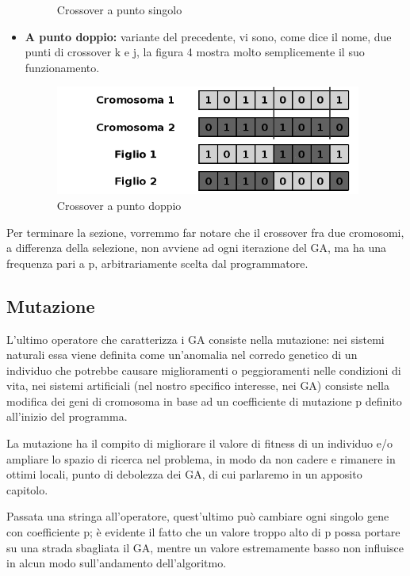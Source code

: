 \begin{itemize}
\begin{figure}[H]
        \caption{Crossover a punto singolo}
        \label{fig:singlepointcrossover}
    \end{figure}
    \item \textbf{A punto doppio:} variante del precedente, vi sono, come dice il nome, due punti di crossover k e j, la figura 4 mostra molto semplicemente il suo funzionamento.
    \begin{figure}[H]
        \centering
        \hfill
        \includegraphics[width=0.95\textwidth]{Images/CrossoverDoublePoints.png}
        \hspace*{\fill}
        \caption{Crossover a punto doppio}
        \label{fig:doublepointcrossover}
    \end{figure}
\end{itemize}
Per terminare la sezione, vorremmo far notare che il crossover fra due cromosomi, a differenza della selezione, non avviene ad ogni iterazione del GA, ma ha una frequenza pari a p, arbitrariamente scelta dal programmatore. 
\subsection{Mutazione}
L'ultimo operatore che caratterizza i GA consiste nella mutazione: nei sistemi naturali essa viene definita come un'anomalia nel corredo genetico di un individuo che potrebbe causare miglioramenti o peggioramenti nelle condizioni di vita, nei sistemi artificiali (nel nostro specifico interesse, nei GA) consiste nella modifica dei geni di cromosoma in base ad un coefficiente di mutazione p definito all'inizio del programma.

La mutazione ha il compito di migliorare il valore di fitness di un individuo e/o ampliare lo spazio di ricerca nel problema, in modo da non cadere e rimanere in ottimi locali, punto di debolezza dei GA, di cui parlaremo in un apposito capitolo.

Passata una stringa all'operatore, quest'ultimo pu\`o cambiare ogni singolo gene con coefficiente p; \`e evidente il fatto che un valore troppo alto di p possa portare su una strada sbagliata il GA, mentre un valore estremamente basso non influisce in alcun modo sull'andamento dell'algoritmo.
\newpage